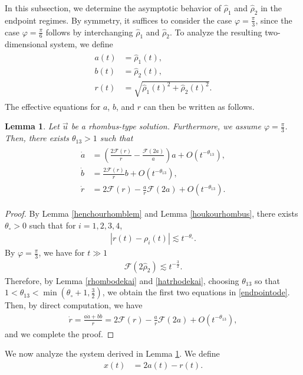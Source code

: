 \documentclass[10pt,a4paper]{amsart}
\newtheorem{lemma}[theorem]{Lemma}
\numberwithin{equation}{section}
\begin{document}
In this subsection, we determine the asymptotic behavior of $\hat{\rho}_1$ and $\hat{\rho}_2$ in the endpoint regimes. By symmetry,
it suffices to consider the case $\varphi=\frac{\pi}{3}$, since the case $\varphi=\frac{\pi}{6}$ follows by interchanging $\hat{\rho}_1$ and $\hat{\rho}_2$. To analyze the resulting two-dimensional system, we define
\begin{align}\label{abrdef}
\begin{aligned}
a(t)&=\hat{\rho}_1(t),
\\
b(t)&=\hat{\rho}_2(t),
\\
r(t)&=\sqrt{\hat{\rho}_1(t)^2+\hat{\rho}_2(t)^2}.
\end{aligned}
\end{align}
The effective equations for $a$, $b$, and $r$ can then be written as follows.
\begin{lemma}\label{endpointlem1}
Let $\vec{u}$ be a rhombus-type solution. Furthermore, we assume $\varphi=\frac{\pi}{3}$. Then,  there exists $\theta_{13}>1$ such that
\begin{align}\label{endpointode}
\begin{aligned}
\dot{a}&=\left(\frac{2\mathcal{F}(r)}{r}-\frac{\mathcal{F}(2a)}{a}\right)a+O\left(t^{-\theta_{13}}\right),
\\
\dot{b}&=\frac{2\mathcal{F}(r)}{r}b+O\left(t^{-\theta_{13}}\right),
\\
\dot{r}&=2\mathcal{F}(r)-\frac{a}{r}\mathcal{F}(2a)+O\left(t^{-\theta_{13}}\right).
\end{aligned}
\end{align}
\end{lemma}
\begin{proof}
By Lemma \ref{henchourhomblem} and Lemma \ref{houkourhombus}, there exists $\theta_{\circ}>0$ such that for $i=1,2,3,4$,
\begin{align*}
\left|r(t)-\rho_i(t)\right|\lesssim t^{-\theta_{\circ}}.
\end{align*}
By $\varphi=\frac{\pi}{3}$, we have for $t\gg 1$
\begin{align}\label{hatrhodekai}
\mathcal{F}(2\hat{\rho}_2)\lesssim t^{-\frac{3}{2}}.
\end{align}
Therefore, by Lemma \ref{rhombodekai} and \eqref{hatrhodekai}, choosing $\theta_{13}$ so that $1<\theta_{13}<\min{(\theta_{\circ}+1,\frac{3}{2})}$, 
we obtain the first two equations in \eqref{endpointode}. Then, by direct computation, we have
\begin{align*}
\dot{r}=\frac{a\dot{a}+b\dot{b}}{r}=2\mathcal{F}(r)-\frac{a}{r}\mathcal{F}(2a)+O\left(t^{-\theta_{13}}\right),
\end{align*}
and we complete the proof.
\end{proof}
We now analyze the system derived in Lemma \ref{endpointlem1}. We define 
\begin{align*}
x(t)&=2a(t)-r(t).
\end{align*}
\end{document}
